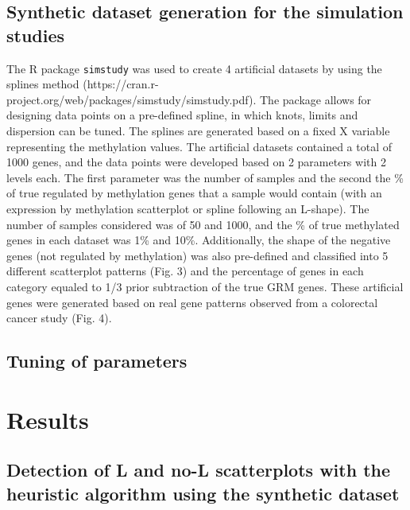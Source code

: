 \documentclass[10pt,letterpaper]{article}
\begin{document}
\hypertarget{synthetic-dataset-generation-for-the-simulation-studies}{%
\subsection{Synthetic dataset generation for the simulation
studies}\label{synthetic-dataset-generation-for-the-simulation-studies}}

The R package \texttt{simstudy} was used to create 4 artificial datasets
by using the splines method
(https://cran.r-project.org/web/packages/simstudy/simstudy.pdf). The
package allows for designing data points on a pre-defined spline, in
which knots, limits and dispersion can be tuned. The splines are
generated based on a fixed X variable representing the methylation
values. The artificial datasets contained a total of 1000 genes, and the
data points were developed based on 2 parameters with 2 levels each. The
first parameter was the number of samples and the second the \% of true
regulated by methylation genes that a sample would contain (with an
expression by methylation scatterplot or spline following an L-shape).
The number of samples considered was of 50 and 1000, and the \% of true
methylated genes in each dataset was 1\% and 10\%. Additionally, the
shape of the negative genes (not regulated by methylation) was also
pre-defined and classified into 5 different scatterplot patterns (Fig.
3) and the percentage of genes in each category equaled to 1/3 prior
subtraction of the true GRM genes. These artificial genes were generated
based on real gene patterns observed from a colorectal cancer study
(Fig. 4).

\hypertarget{tuning-of-parameters}{%
\subsection{Tuning of parameters}\label{tuning-of-parameters}}

\hypertarget{results}{%
\section{Results}\label{results}}

\hypertarget{detection-of-l-and-no-l-scatterplots-with-the-heuristic-algorithm-using-the-synthetic-dataset}{%
\subsection{Detection of L and no-L scatterplots with the heuristic
algorithm using the synthetic
dataset}\label{detection-of-l-and-no-l-scatterplots-with-the-heuristic-algorithm-using-the-synthetic-dataset}}
\end{document}
